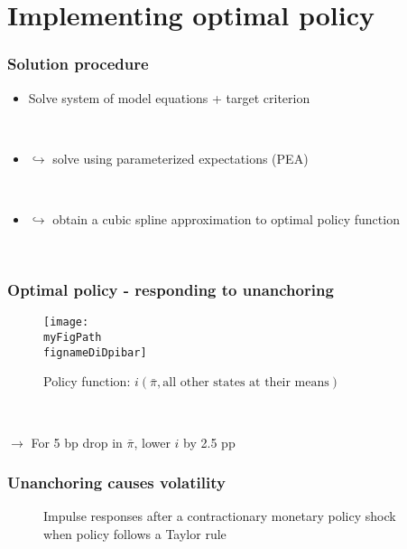 \documentclass[10pt]{beamer}
\def \myFigPath {../../../figures/}
\def\fignameDiDpibar{analyze_opt_policy_ip17_Sep_2020}
\def\fignameIRFanchored{RIR_anch_psi_pi1_5_command_IRFs_approx_pretty_2020_09_17}
\def\fignameIRFunanchored{RIR_unanch_psi_pi1_5_command_IRFs_approx_pretty_2020_09_17}
\begin{document}
\section{Implementing optimal policy}


\begin{frame}
	\frametitle{Solution procedure}
	
\begin{itemize}
\item[] Solve system of model equations + target criterion 

\

\item[] $\hookrightarrow$ solve using parameterized expectations (PEA)

\


\item[] $\hookrightarrow$ obtain a cubic spline approximation to optimal policy function

\

\end{itemize}


\end{frame}


\begin{frame}
	\frametitle{Optimal policy - responding to unanchoring }
	
\begin{figure}[h!]
\texttt{[image: \\myFigPath \\fignameDiDpibar]}
\caption{Policy function: $i(\bar{\pi}, \text{all other states at their means})$}
\end{figure} 

\

\pause

$\rightarrow$ For 5 bp drop in $\bar{\pi}$, lower $i$ by 2.5 pp

\end{frame}

\begin{frame}
	\frametitle{Unanchoring causes volatility}

\begin{figure}[h!]
\caption{Impulse responses after a contractionary monetary policy shock when policy follows a Taylor rule}
\label{IRF}
\end{figure}	

\end{frame}
\end{document}
